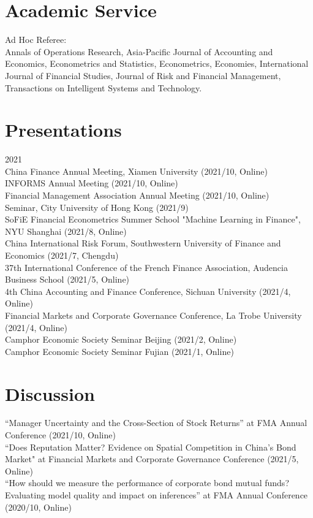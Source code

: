 \documentclass[margin]{res}
\begin{document}
\begin{resume}
\section{\sc Academic Service}

Ad Hoc Referee: \\
Annals of Operations Research,
Asia-Pacific Journal of Accounting and Economics,
Econometrics and Statistics, 
Econometrics,
Economies, 
International Journal of Financial Studies,
Journal of Risk and Financial Management,
Transactions on Intelligent Systems and Technology.

\section{\sc Presentations}

2021 \\
China Finance Annual Meeting, Xiamen University (2021/10, Online) \\
INFORMS Annual Meeting (2021/10, Online) \\
Financial Management Association Annual Meeting (2021/10, Online) \\
Seminar, City University of Hong Kong (2021/9) \\
SoFiE Financial Econometrics Summer School "Machine Learning in Finance", NYU Shanghai (2021/8, Online) \\
China International Risk Forum, Southwestern University of Finance and Economics  (2021/7, Chengdu) \\
37th International Conference of the French Finance Association, Audencia Business School (2021/5, Online) \\
4th China Accounting and Finance Conference, Sichuan University (2021/4, Online) \\
Financial Markets and Corporate Governance Conference, La Trobe University (2021/4, Online) \\
Camphor Economic Society Seminar Beijing (2021/2, Online) \\
Camphor Economic Society Seminar Fujian (2021/1, Online) \\


\section{\sc Discussion}

``Manager Uncertainty and the Cross-Section of Stock Returns'' at FMA Annual Conference (2021/10, Online)
\\
``Does Reputation Matter? Evidence on Spatial Competition in China’s Bond Market" at Financial Markets and Corporate Governance Conference (2021/5, Online)
\\
``How should we measure the performance of corporate bond mutual funds? Evaluating model quality and impact on inferences'' at FMA Annual Conference (2020/10, Online)


\end{resume}
\end{document}
